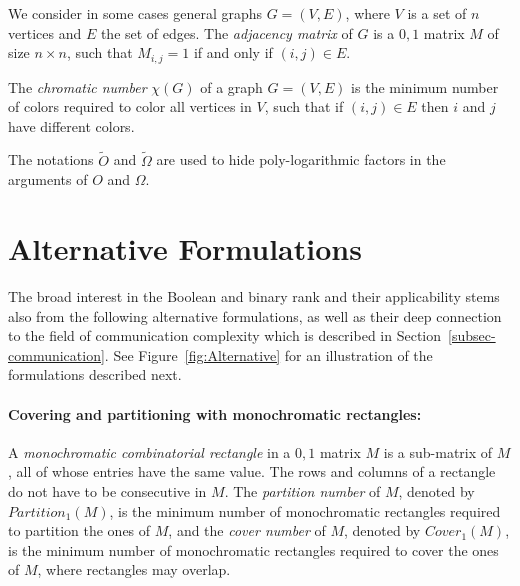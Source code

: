 \documentclass[11pt]{article}
\begin{document}
We consider in some cases general graphs $G = (V,E)$, where $V$ is a set of $n$ vertices and $E$ the set of edges.
The  {\em adjacency matrix} of  $G$  is a $0,1$ matrix $M$ of size $n \times n$, such that
$M_{i,j} = 1$ if and only if $(i,j) \in E$.

The {\em chromatic number} $\chi(G)$ of a graph $G = (V,E)$ is the minimum number of colors required to color all vertices in $V$, such that if $(i,j) \in E$  then $i$ and $j$ have different colors.

The notations $\widetilde{O}$ and $\widetilde{\Omega}$ are used to hide poly-logarithmic factors in the arguments of $O$ and $\Omega$.


\section{Alternative Formulations}
\label{Sec:equivalent}

The broad interest in the Boolean and binary rank and their applicability stems also from the following alternative formulations,
as well as their deep connection to the field of communication complexity which is described in Section~\ref{subsec-communication}.
See Figure~\ref{fig:Alternative} for an illustration of the  formulations described next.


\vspace{-0.5 cm}
\paragraph{Covering and partitioning with monochromatic rectangles:}  A {\em monochromatic combinatorial rectangle} in a $0,1$ matrix $M$ is a sub-matrix of $M$, all of whose entries have the same value.
The rows and columns of a rectangle do not have to be consecutive in $M$.
The {\em partition number} of $M$, denoted by $Partition_1(M)$, is the minimum number of monochromatic rectangles required to partition the ones of $M$,
and the {\em cover number} of $M$, denoted by $Cover_1(M)$, is the minimum number of monochromatic rectangles required to cover the ones of $M$, where rectangles may overlap.
\end{document}
